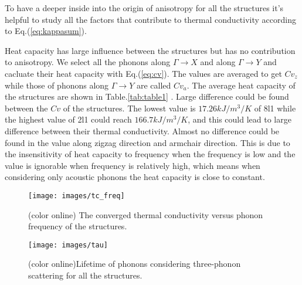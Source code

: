 \documentclass[%
 reprint,
 amsmath,amssymb,
 aps,
 prb,
]{revtex4-1}
\begin{document}
To have a deeper inside into the origin of anisotropy for all the structures it's helpful to study all the factors that contribute to thermal conductivity according to Eq.(\ref{eq:kappasum}).

Heat capacity has large influence between the structures but has no contribution to anisotropy. We select all the phonons along  $\Gamma\rightarrow X$ and along $\Gamma \rightarrow Y$ and cacluate their heat capacity with Eq.(\ref{eq:cv}). The values are averaged to get $Cv_z$ while those of phonons along $\Gamma\rightarrow Y$ are called $Cv_a$. The average heat capacity of the structures are shown in Table.\ref{tab:table1} . Large difference could be found between the $Cv$ of the structures. The lowest value is $17.26 kJ/m^3/K$ of 8l1 while the highest value of 2l1 could reach $166.7 kJ/m^3/K$, and this could lead to large difference between their thermal conductivity.  Almost no difference could be found in the value along zigzag direction and armchair direction. This is due to the insensitivity of heat capacity to frequency when the frequency is low and the value is ignorable when frequency is relatively high, which means when considering only acoustic phonons the heat capacity is close to constant.

\begin{figure}[b]
  \texttt{[image: images/tc\_freq]}
  \caption{\label{fig:tc_freq} (color online)  The converged thermal conductivity versus phonon frequency of the structures. }
\end{figure}

\begin{figure}[b]
  \texttt{[image: images/tau]}
  \caption{\label{fig:tau} (color online)Lifetime of phonons considering three-phonon scattering for all the structures. }
\end{figure}
\end{document}
